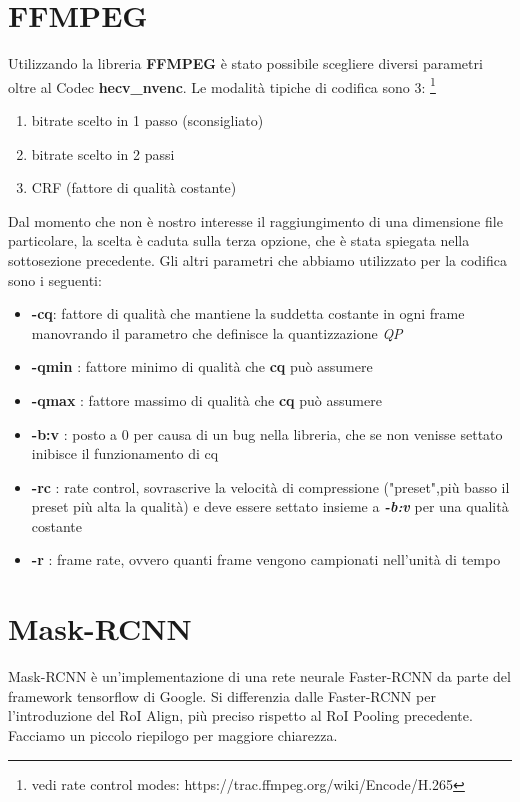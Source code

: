 \section{FFMPEG}
\label{sec:coding_library}
Utilizzando la libreria \textbf{FFMPEG} è stato possibile scegliere diversi parametri oltre al Codec \textbf{hecv\_nvenc}. 
Le modalità tipiche di codifica sono 3: \footnote{vedi rate control modes: https://trac.ffmpeg.org/wiki/Encode/H.265} 
\begin{enumerate}
\item bitrate scelto in 1 passo (sconsigliato)
\item bitrate scelto in 2 passi
\item CRF (fattore di qualità costante)
\end{enumerate}
Dal momento che non è nostro interesse il raggiungimento di una dimensione file particolare, la scelta è caduta sulla terza opzione, che è stata spiegata nella sottosezione precedente.
Gli altri parametri che abbiamo utilizzato per la codifica sono i seguenti:
\begin{itemize}
\item \textbf{-cq}: fattore di qualità che mantiene la suddetta costante in ogni frame manovrando il parametro che definisce la quantizzazione \emph{QP}
\item \textbf{-qmin} : fattore minimo di qualità che \textbf{cq} può assumere
\item \textbf{-qmax} : fattore massimo di qualità che \textbf{cq} può assumere
\item \textbf{-b:v} : posto a 0 per causa di un bug nella libreria, che se non venisse settato inibisce il funzionamento di cq
\item \textbf{-rc} : rate control, sovrascrive la velocità di compressione ("preset",più basso il preset più alta la qualità) e deve essere settato insieme a \textbf{\emph{-b:v}} per una qualità costante
\item \textbf{-r} : frame rate, ovvero quanti frame vengono campionati nell'unità di tempo
\end{itemize}

\section{Mask-RCNN}
\label{sec:Mask-RCNN_desc}
Mask-RCNN è un'implementazione di una rete neurale Faster-RCNN da parte del framework tensorflow di Google. Si differenzia dalle Faster-RCNN per l'introduzione del RoI Align, più preciso rispetto al RoI Pooling precedente. Facciamo un piccolo riepilogo per maggiore chiarezza.
